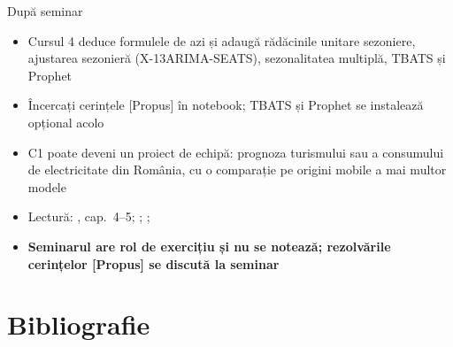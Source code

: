 \begin{frame}{După seminar}
\itemsize{\small}
\begin{itemize}
    \item Cursul 4 deduce formulele de azi și adaugă rădăcinile unitare sezoniere, ajustarea sezonieră (X-13ARIMA-SEATS), sezonalitatea multiplă, TBATS și Prophet
    \item Încercați cerințele [Propus] în notebook; TBATS și Prophet se instalează opțional acolo
    \item C1 poate deveni un proiect de echipă: prognoza turismului sau a consumului de electricitate din România, cu o comparație pe origini mobile a mai multor modele
    \item Lectură: , cap.~4--5; ; ; 
    \item \textbf{Seminarul are rol de exercițiu și nu se notează; rezolvările cerințelor [Propus] se discută la seminar}
\end{itemize}
\end{frame}


\section{Bibliografie}


